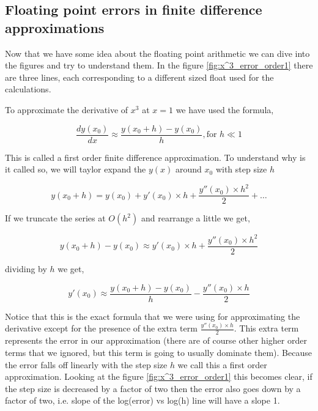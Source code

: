 \subsection{Floating point errors in finite difference approximations}
\label{chap3:floating_point_errors}
Now that we have some idea about the floating point arithmetic we can dive into the figures and try to understand them.
In the figure \ref{fig:x^3_error_order1} there are three lines, each corresponding to a different sized float used for the calculations.

To approximate the derivative of $x^3$ at $x=1$ we have used the formula,

\begin{equation}
    \frac{dy(x_0)}{dx} \approx \frac{y(x_0 + h) - y(x_0)}{h} , \text{for } h \ll 1
    \label{eq:first_order_2}
\end{equation}

This is called a  first order finite difference approximation. To understand why is it called so, we will taylor expand the $y(x)$ around $x_0$ with step size $h$

\begin{equation}
    y(x_0 + h) = y(x_0) + y'(x_0) \times h +\frac{y''(x_0) \times h^2}{2} + \dots
\end{equation}

If we truncate the series at $O(h^2)$ and rearrange a little we get,

\begin{equation}
    y(x_0 + h) - y(x_0) \approx y'(x_0) \times h +\frac{y''(x_0) \times h^2}{2}
\end{equation}

dividing by $h$ we get,

\begin{equation}
    y'(x_0)  \approx \frac{y(x_0 + h) - y(x_0)}{h} - \frac{y''(x_0) \times h}{2}
    \label{eq:1d_1o_error}
\end{equation}

Notice that this is the exact formula that we were using for approximating the derivative except for the presence of the extra term $\frac{y''(x_0) \times h}{2}$. This extra term represents the error in our approximation (there are of course other higher order terms that we ignored, but this term is going to usually dominate them). Because the error falls off linearly with the step size $h$ we call this a first order approximation. Looking at the figure \ref{fig:x^3_error_order1} this becomes clear, if the step size is decreased by a factor of two then the error also goes down by a factor of two, i.e. slope of the log(error) vs log(h) line will have a slope 1.

